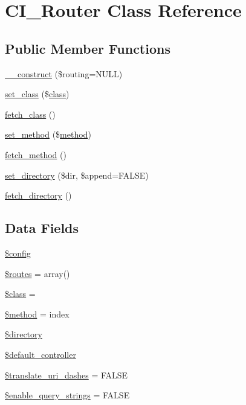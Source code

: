 \hypertarget{class_c_i___router}{}\section{C\+I\+\_\+\+Router Class Reference}
\label{class_c_i___router}
\subsection*{Public Member Functions}
\begin{DoxyCompactItemize}
\item 
\mbox{\hyperlink{class_c_i___router_a9b81050c9907794a374f5088743a0252}{\+\_\+\+\_\+construct}} (\$routing=N\+U\+LL)
\item 
\mbox{\hyperlink{class_c_i___router_afbb540df5c161fe69909a5f8182f910f}{set\+\_\+class}} (\$\mbox{\hyperlink{waiter_2olaporan_8php_a185c73c6507391d1eb38c776b68ce96d}{class}})
\item 
\mbox{\hyperlink{class_c_i___router_af5586c3f514021e9e2588e102620d237}{fetch\+\_\+class}} ()
\item 
\mbox{\hyperlink{class_c_i___router_a6a42036a115946acdaf0975c994106fb}{set\+\_\+method}} (\$\mbox{\hyperlink{waiter_2order_8php_ac0cc2006fd803bf741cbbe406e3f6361}{method}})
\item 
\mbox{\hyperlink{class_c_i___router_ad408b28e3a095e7435f21e95d93e7714}{fetch\+\_\+method}} ()
\item 
\mbox{\hyperlink{class_c_i___router_a80573f758526ffa1beba61be5d45baff}{set\+\_\+directory}} (\$dir, \$append=F\+A\+L\+SE)
\item 
\mbox{\hyperlink{class_c_i___router_a7a089f2cfae731dcc9e59a71d20208ef}{fetch\+\_\+directory}} ()
\end{DoxyCompactItemize}
\subsection*{Data Fields}
\begin{DoxyCompactItemize}
\item 
\mbox{\hyperlink{class_c_i___router_a49c7011be9c979d9174c52a8b83e5d8e}{\$config}}
\item 
\mbox{\hyperlink{class_c_i___router_a8f7eb04a54e0f0bfc0cedeb9899ce4a8}{\$routes}} = array()
\item 
\mbox{\hyperlink{class_c_i___router_a252ba022809910ea710a068fc1bab657}{\$class}} = \textquotesingle{}\textquotesingle{}
\item 
\mbox{\hyperlink{class_c_i___router_a12661b2fc0f57f97e30a1620889ce9c6}{\$method}} = \textquotesingle{}index\textquotesingle{}
\item 
\mbox{\hyperlink{class_c_i___router_a1b07c630eb02f770a082a013373a16d6}{\$directory}}
\item 
\mbox{\hyperlink{class_c_i___router_ab949cccd963058f0937d04bc26ee24a7}{\$default\+\_\+controller}}
\item 
\mbox{\hyperlink{class_c_i___router_a9693c124c7019ed8ec57166661044ba2}{\$translate\+\_\+uri\+\_\+dashes}} = F\+A\+L\+SE
\item 
\mbox{\hyperlink{class_c_i___router_a8495f59271097c83f7703d433d96ff6d}{\$enable\+\_\+query\+\_\+strings}} = F\+A\+L\+SE
\end{DoxyCompactItemize}
